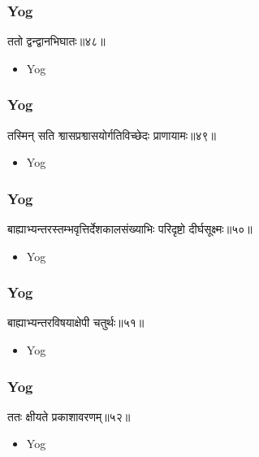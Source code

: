 \begin{frame}[fragile]\frametitle{Yog}
\begin{sanskrit}
ततो द्वन्द्वानभिघातः॥४८॥
\end{sanskrit}
	\begin{itemize}
	\item Yog 
	\end{itemize}
\end{frame}


\begin{frame}[fragile]\frametitle{Yog}
\begin{sanskrit}
तस्मिन् सति श्वासप्रश्वासयोर्गतिविच्छेदः प्राणायामः॥४९॥
\end{sanskrit}
	\begin{itemize}
	\item Yog 
	\end{itemize}
\end{frame}



\begin{frame}[fragile]\frametitle{Yog}
\begin{sanskrit}
बाह्याभ्यन्तरस्तम्भवृत्तिर्देशकालसंख्याभिः परिदृष्टो दीर्घसूक्ष्मः॥५०॥
\end{sanskrit}
	\begin{itemize}
	\item Yog 
	\end{itemize}
\end{frame}


\begin{frame}[fragile]\frametitle{Yog}
\begin{sanskrit}
बाह्याभ्यन्तरविषयाक्षेपी चतुर्थः॥५१॥
\end{sanskrit}
	\begin{itemize}
	\item Yog 
	\end{itemize}
\end{frame}

\begin{frame}[fragile]\frametitle{Yog}
\begin{sanskrit}
ततः क्षीयते प्रकाशावरणम्॥५२॥
\end{sanskrit}
	\begin{itemize}
	\item Yog 
	\end{itemize}
\end{frame}

